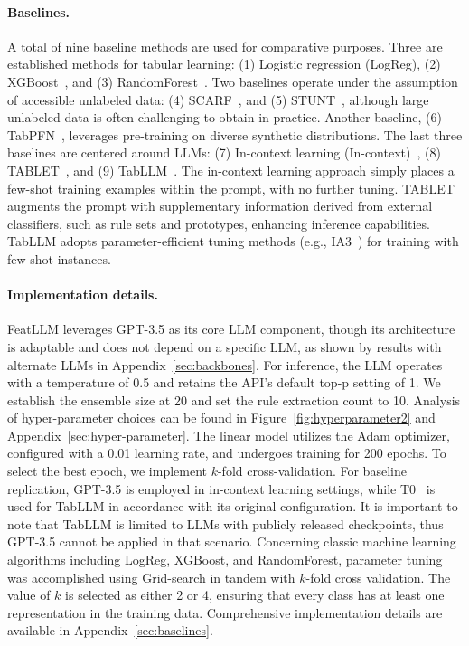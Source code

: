 \vspace*{-0.12in}
\paragraph{Baselines.}
A total of nine baseline methods are used for comparative purposes. Three are established methods for tabular learning: (1) Logistic regression (LogReg), (2) XGBoost~\cite{chen2016xgboost}, and (3) RandomForest~\cite{ho1995random}. Two baselines operate under the assumption of accessible unlabeled data: (4) SCARF~\cite{bahri2022scarf}, and (5) STUNT~\cite{nam2023stunt}, although large unlabeled data is often challenging to obtain in practice. Another baseline, (6) TabPFN~\cite{hollmann2022tabpfn}, leverages pre-training on diverse synthetic distributions. The last three baselines are centered around LLMs: (7) In-context learning (In-context)~\cite{wei2022emergent}, (8) TABLET~\cite{slack2023tablet}, and (9) TabLLM~\cite{hegselmann2023tabllm}. The in-context learning approach simply places a few-shot training examples within the prompt, with no further tuning. TABLET augments the prompt with supplementary information derived from external classifiers, such as rule sets and prototypes, enhancing inference capabilities. TabLLM adopts parameter-efficient tuning methods (e.g., IA3~\cite{liu2022few}) for training with few-shot instances.

\vspace*{-0.12in}
\paragraph{Implementation details.}
\textsf{FeatLLM} leverages GPT-3.5 as its core LLM component, though its architecture is adaptable and does not depend on a specific LLM, as shown by results with alternate LLMs in Appendix~\ref{sec:backbones}. For inference, the LLM operates with a temperature of 0.5 and retains the API's default top-p setting of 1. We establish the ensemble size at 20 and set the rule extraction count to 10. Analysis of hyper-parameter choices can be found in Figure~\ref{fig:hyperparameter2} and Appendix~\ref{sec:hyper-parameter}. The linear model utilizes the Adam optimizer, configured with a 0.01 learning rate, and undergoes training for 200 epochs. To select the best epoch, we implement $k$-fold cross-validation. For baseline replication, GPT-3.5 is employed in in-context learning settings, while T0~\cite{sanh2022multitask} is used for TabLLM in accordance with its original configuration. It is important to note that TabLLM is limited to LLMs with publicly released checkpoints, thus GPT-3.5 cannot be applied in that scenario. Concerning classic machine learning algorithms including LogReg, XGBoost, and RandomForest, parameter tuning was accomplished using Grid-search in tandem with $k$-fold cross validation. The value of $k$ is selected as either 2 or 4, ensuring that every class has at least one representation in the training data. Comprehensive implementation details are available in Appendix~\ref{sec:baselines}.

